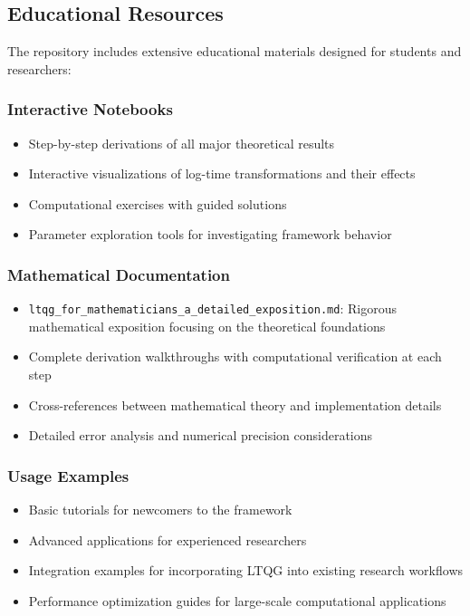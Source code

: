 \subsection{Educational Resources}
\label{subsec:educational_resources}

The repository includes extensive educational materials designed for students and researchers:

\subsubsection{Interactive Notebooks}

\begin{itemize}
\item Step-by-step derivations of all major theoretical results
\item Interactive visualizations of log-time transformations and their effects
\item Computational exercises with guided solutions
\item Parameter exploration tools for investigating framework behavior
\end{itemize}

\subsubsection{Mathematical Documentation}

\begin{itemize}
\item \texttt{ltqg\_for\_mathematicians\_a\_detailed\_exposition.md}: Rigorous mathematical exposition focusing on the theoretical foundations
\item Complete derivation walkthroughs with computational verification at each step
\item Cross-references between mathematical theory and implementation details
\item Detailed error analysis and numerical precision considerations
\end{itemize}

\subsubsection{Usage Examples}

\begin{itemize}
\item Basic tutorials for newcomers to the framework
\item Advanced applications for experienced researchers
\item Integration examples for incorporating LTQG into existing research workflows
\item Performance optimization guides for large-scale computational applications
\end{itemize}


